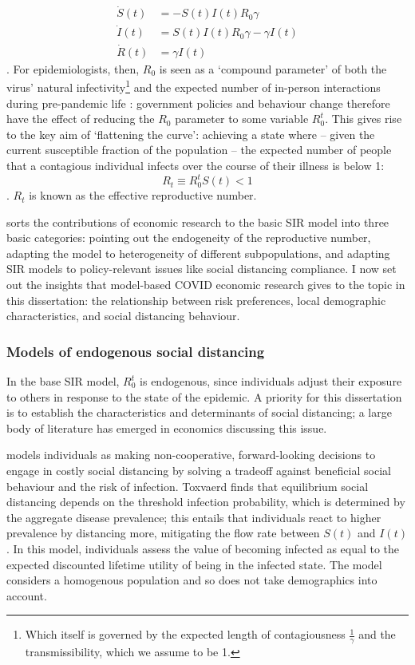 \documentclass{article}
\begin{document}
\begin{align}
    \dot{S}(t)&= -S(t)I(t)R_0 \gamma \\
    \dot{I}(t)&= S(t)I(t)R_0 \gamma - \gamma I(t) \\
    \dot{R}(t)&= \gamma I(t)
\end{align}
. For epidemiologists, then, \(R_0\) is seen as a `compound parameter' of both the virus' natural infectivity\footnote{Which itself is governed by the expected length of contagiousness \(\frac{1}{\gamma}\) and the transmissibility, which we assume to be 1.} and the expected number of in-person interactions during pre-pandemic life \parencite[84]{averyEconomistGuideEpidemiology2020}: government policies and behaviour change therefore have the effect of reducing the \(R_0\) parameter to some variable \(R^t_0\). This gives rise to the key aim of `flattening the curve': achieving a state where -- given the current susceptible fraction of the population -- the expected number of people that a contagious individual infects over the course of their illness is below 1:
\begin{equation}
    R_t \equiv R^t_0 S(t) < 1
\end{equation}. \(R_t\) is known as the effective reproductive number.

\textcite{averyEconomistGuideEpidemiology2020} sorts the contributions of economic research to the basic SIR model into three basic categories: pointing out the endogeneity of the reproductive number, adapting the model to heterogeneity of different subpopulations, and adapting SIR models to policy-relevant issues like social distancing compliance. I now set out the insights that model-based COVID economic research gives to the topic in this dissertation: the relationship between risk preferences, local demographic characteristics, and social distancing behaviour.


\subsubsection{Models of endogenous social distancing}
In the base SIR model, \(R^t_0\) is endogenous, since individuals adjust their exposure to others in response to the state of the epidemic. A priority for this dissertation is to establish the characteristics and determinants of social distancing; a large body of literature has emerged in economics discussing this issue. 

\textcite{toxvaerdEquilibriumSocialDistancing2020} models individuals as making non-cooperative, forward-looking decisions to engage in costly social distancing by solving a tradeoff against beneficial social behaviour and the risk of infection. Toxvaerd finds that equilibrium social distancing depends on the threshold infection probability, which is determined by the aggregate disease prevalence; this entails that individuals react to higher prevalence by distancing more, mitigating the flow rate between \(S(t)\) and \(I(t)\). In this model, individuals assess the value of becoming infected as equal to the expected discounted lifetime utility of being in the infected state. The model considers a homogenous population and so does not take demographics into account.
\end{document}
